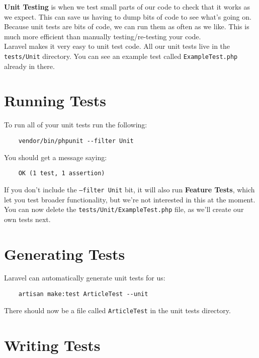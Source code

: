 \textbf{Unit Testing} is when we test small parts of our code to check that it works as we expect. This can save us having to dump bits of code to see what's going on.
\\

Because unit tests are bits of code, we can run them as often as we like. This is much more efficient than manually testing/re-testing your code.
\\

Laravel makes it very easy to unit test code. All our unit tests live in the \texttt{tests/Unit} directory. You can see an example test called \texttt{ExampleTest.php} already in there.

\section{Running Tests}

To run all of your unit tests run the following:

\begin{verbatim}
    vendor/bin/phpunit --filter Unit
\end{verbatim}

You should get a message saying:

\begin{verbatim}
    OK (1 test, 1 assertion)
\end{verbatim}

If you don't include the \texttt{--filter Unit} bit, it will also run \textbf{Feature Tests}, which let you test broader functionality, but we're not interested in this at the moment.
\\

You can now delete the \texttt{tests/Unit/ExampleTest.php} file, as we'll create our own tests next.


\section{Generating Tests}

Laravel can automatically generate unit tests for us:

\begin{verbatim}
    artisan make:test ArticleTest --unit
\end{verbatim}

There should now be a file called \texttt{ArticleTest} in the unit tests directory.


\section{Writing Tests}

